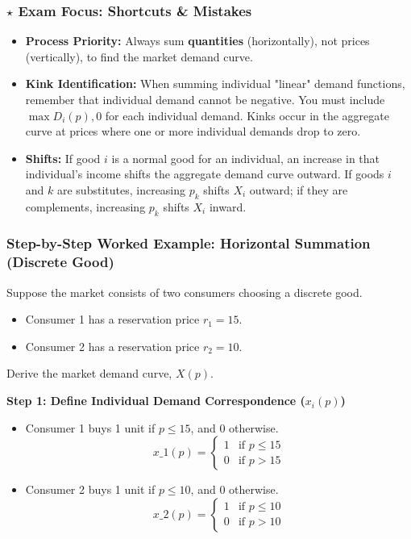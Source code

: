 \documentclass{article}
\begin{document}
\subsubsection*{$\star$ Exam Focus: Shortcuts \& Mistakes}
\begin{itemize}
    \item \textbf{Process Priority:} Always sum \textbf{quantities} (horizontally), not prices (vertically), to find the market demand curve.
    \item \textbf{Kink Identification:} When summing individual "linear" demand functions, remember that individual demand cannot be negative. You must include $\max{D_i(p), 0}$ for each individual demand. Kinks occur in the aggregate curve at prices where one or more individual demands drop to zero.
    \item \textbf{Shifts:} If good $i$ is a normal good for an individual, an increase in that individual's income shifts the aggregate demand curve outward. If goods $i$ and $k$ are substitutes, increasing $p_k$ shifts $X_i$ outward; if they are complements, increasing $p_k$ shifts $X_i$ inward.
\end{itemize}

\subsubsection*{Step-by-Step Worked Example: Horizontal Summation (Discrete Good)}

Suppose the market consists of two consumers choosing a discrete good.
\begin{itemize}
    \item Consumer 1 has a reservation price $r_1 = 15$.
    \item Consumer 2 has a reservation price $r_2 = 10$.
\end{itemize}
Derive the market demand curve, $X(p)$.

\textbf{Step 1: Define Individual Demand Correspondence ($x_i(p)$)}
\begin{itemize}
    \item Consumer 1 buys 1 unit if $p \leq 15$, and 0 otherwise. 
    \[ x\_1(p) = \begin{cases} 1 & \text{if } p \leq 15 \\ 0 & \text{if } p > 15 \end{cases} \]
    \item Consumer 2 buys 1 unit if $p \leq 10$, and 0 otherwise. 
    \[ x\_2(p) = \begin{cases} 1 & \text{if } p \leq 10 \\ 0 & \text{if } p > 10 \end{cases} \]
\end{itemize}
\end{document}

